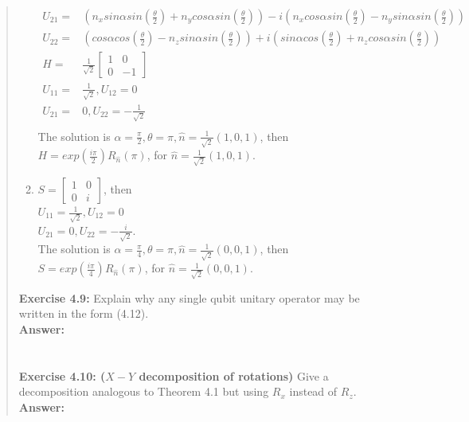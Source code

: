 \documentclass[UTF8]{ctexart}
\begin{document}
\begin{quote}
\begin{enumerate}[1.]
\begin{equation}
\begin{aligned}
            U_{21}=&\left( n_{x}sin \alpha sin(\frac{\theta}{2})+n_{y}cos\alpha sin(\frac{\theta}{2})\right)
            -i\left(n_{x}cos \alpha sin(\frac{\theta}{2})-n_{y}sin\alpha sin(\frac{\theta}{2}) \right) \\
            U_{22}=&\left( cos \alpha cos(\frac{\theta}{2})-n_{z}sin\alpha sin(\frac{\theta}{2})\right)
            +i\left(sin \alpha cos(\frac{\theta}{2})+n_{z}cos\alpha sin(\frac{\theta}{2}) \right) \\
			H=&\frac{1}{\sqrt{2}}\begin{bmatrix}
                1 &0\\ 0 & -1
            \end{bmatrix}
			\\
			U_{11}=&\frac{1}{\sqrt{2}}, U_{12}=0\\
			U_{21}=&0, U_{22}=-\frac{1}{\sqrt{2}}\\
		\end{aligned}
	\end{equation}
	The solution is $\alpha=\frac{\pi}{2}, \theta=\pi, \hat{n}=\frac{1}{\sqrt{2}}(1,0,1)$, then \\
		$H=exp(\frac{i\pi}{2})R_{\hat{n}}(\pi)$, for $\hat{n}=\frac{1}{\sqrt{2}}(1,0,1)$. 
	\\
	\item $	S=\begin{bmatrix}1 & 0 \\ 0 & i \end{bmatrix} $, then \\
	 $U_{11}=\frac{1}{\sqrt{2}}, U_{12}=0$\\
	$ U_{21}=0, U_{22}=-\frac{i}{\sqrt{2}}$.\\
	The solution is $ \alpha=\frac{\pi}{4}, \theta=\pi, \hat{n}=\frac{1}{\sqrt{2}}(0,0,1)$, then \\
	$S =exp(\frac{i\pi}{4})R_{\hat{n}}(\pi)$, for $\hat{n}=\frac{1}{\sqrt{2}}(0,0,1)$.
\end{enumerate}
\textbf{Exercise 4.9: } Explain why any single qubit unitary operator may be written in the form (4.12).
\\
\textbf{Answer:}\\
\\
\\
\textbf{Exercise 4.10: ($X-Y$ decomposition of rotations) }   Give a decomposition analogous to Theorem 4.1 
but using $R_{x}$ instead of $R_{z}$.
 \\
\textbf{Answer:}	 \\
\begin{equation}

\end{equation}
\end{quote}
\end{document}
